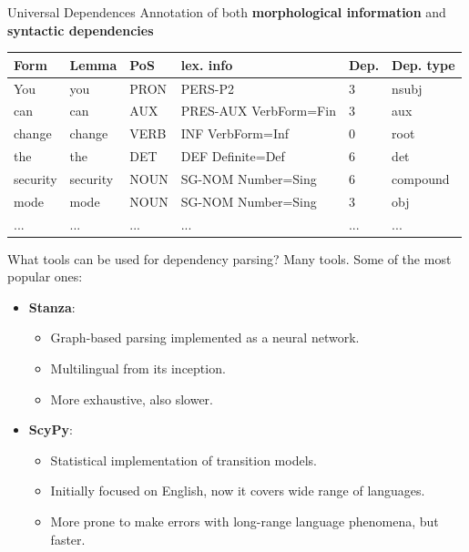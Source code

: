 \documentclass{beamer}
\begin{document}
\begin{frame}{Universal Dependences}
    Annotation of both \textbf{morphological information} and \textbf{syntactic dependencies}

    \begin{center}
        \small
   \begin{tabular}{l|l|l|l|l|l}
Form       & Lemma     & PoS & lex. info & Dep. & Dep. type   \\
\hline
You      & you      & PRON & PERS-P2                & 3 & nsubj \\
can      & can      & AUX  & PRES-AUX VerbForm=Fin  & 3 & aux \\
change   & change   & VERB & INF VerbForm=Inf       & 0 & root \\
the      & the      & DET  & DEF Definite=Def       & 6 & det \\
security & security & NOUN & SG-NOM Number=Sing     & 6 & compound \\
mode     & mode     & NOUN & SG-NOM Number=Sing     & 3 & obj \\
... & ... & ... & ... & ... & ...\\
\end{tabular}
    \end{center}
\end{frame}

\begin{frame}{What tools can be used for dependency parsing?}
    Many tools. Some of the most popular ones:
    \begin{itemize}
        \item \textbf{Stanza}: 
        \begin{itemize}
            \item Graph-based parsing implemented as a neural network. 
            \item Multilingual from its inception.
            \item More exhaustive, also slower.
        \end{itemize}
        \item \textbf{ScyPy}:
        \begin{itemize}
            \item Statistical implementation of transition models.
            \item Initially focused on English, now it covers wide range of languages.
            \item More prone to make errors with long-range language phenomena, but faster.
        \end{itemize}
    \end{itemize}
\end{frame}
\end{document}
